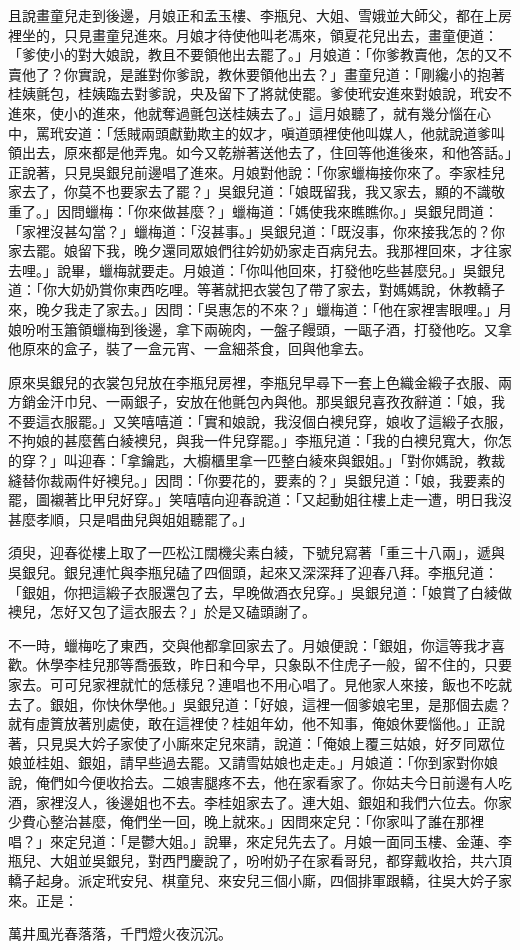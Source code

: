 且說畫童兒走到後邊，月娘正和孟玉樓、李瓶兒、大姐、雪娥並大師父，都在上房裡坐的，只見畫童兒進來。月娘才待使他叫老馮來，領夏花兒出去，畫童便道： 「爹使小的對大娘說，教且不要領他出去罷了。」月娘道：「你爹教賣他，怎的又不賣他了？你實說，是誰對你爹說，教休要領他出去？」畫童兒道：「剛纔小的抱著桂姨氈包，桂姨臨去對爹說，央及留下了將就使罷。爹使玳安進來對娘說，玳安不進來，使小的進來，他就奪過氈包送桂姨去了。」這月娘聽了，就有幾分惱在心中，罵玳安道：「恁賊兩頭獻勤欺主的奴才，嗔道頭裡使他叫媒人，他就說道爹叫領出去，原來都是他弄鬼。如今又乾辦著送他去了，住回等他進後來，和他答話。」正說著，只見吳銀兒前邊唱了進來。月娘對他說：「你家蠟梅接你來了。李家桂兒家去了，你莫不也要家去了罷？」吳銀兒道：「娘既留我，我又家去，顯的不識敬重了。」因問蠟梅：「你來做甚麼？」蠟梅道：「媽使我來瞧瞧你。」吳銀兒問道：「家裡沒甚勾當？」蠟梅道：「沒甚事。」吳銀兒道：「既沒事，你來接我怎的？你家去罷。娘留下我，晚夕還同眾娘們往妗奶奶家走百病兒去。我那裡回來，才往家去哩。」說畢，蠟梅就要走。月娘道：「你叫他回來，打發他吃些甚麼兒。」吳銀兒道：「你大奶奶賞你東西吃哩。等著就把衣裳包了帶了家去，對媽媽說，休教轎子來，晚夕我走了家去。」因問：「吳惠怎的不來？」蠟梅道：「他在家裡害眼哩。」月娘吩咐玉簫領蠟梅到後邊，拿下兩碗肉，一盤子饅頭，一甌子酒，打發他吃。又拿他原來的盒子，裝了一盒元宵、一盒細茶食，回與他拿去。

原來吳銀兒的衣裳包兒放在李瓶兒房裡，李瓶兒早尋下一套上色織金緞子衣服、兩方銷金汗巾兒、一兩銀子，安放在他氈包內與他。那吳銀兒喜孜孜辭道：「娘，我不要這衣服罷。」又笑嘻嘻道：「實和娘說，我沒個白襖兒穿，娘收了這緞子衣服，不拘娘的甚麼舊白綾襖兒，與我一件兒穿罷。」李瓶兒道：「我的白襖兒寬大，你怎的穿？」叫迎春：「拿鑰匙，大櫥櫃里拿一匹整白綾來與銀姐。」「對你媽說，教裁縫替你裁兩件好襖兒。」因問：「你要花的，要素的？」吳銀兒道：「娘，我要素的罷，圖襯著比甲兒好穿。」笑嘻嘻向迎春說道：「又起動姐往樓上走一遭，明日我沒甚麼孝順，只是唱曲兒與姐姐聽罷了。」

須臾，迎春從樓上取了一匹松江闊機尖素白綾，下號兒寫著「重三十八兩」，遞與吳銀兒。銀兒連忙與李瓶兒磕了四個頭，起來又深深拜了迎春八拜。李瓶兒道： 「銀姐，你把這緞子衣服還包了去，早晚做酒衣兒穿。」吳銀兒道：「娘賞了白綾做襖兒，怎好又包了這衣服去？」於是又磕頭謝了。

不一時，蠟梅吃了東西，交與他都拿回家去了。月娘便說：「銀姐，你這等我才喜歡。休學李桂兒那等喬張致，昨日和今早，只象臥不住虎子一般，留不住的，只要家去。可可兒家裡就忙的恁樣兒？連唱也不用心唱了。見他家人來接，飯也不吃就去了。銀姐，你快休學他。」吳銀兒道：「好娘，這裡一個爹娘宅里，是那個去處？就有虛篢放著別處使，敢在這裡使？桂姐年幼，他不知事，俺娘休要惱他。」正說著，只見吳大妗子家使了小廝來定兒來請，說道：「俺娘上覆三姑娘，好歹同眾位娘並桂姐、銀姐，請早些過去罷。又請雪姑娘也走走。」月娘道：「你到家對你娘說，俺們如今便收拾去。二娘害腿疼不去，他在家看家了。你姑夫今日前邊有人吃酒，家裡沒人，後邊姐也不去。李桂姐家去了。連大姐、銀姐和我們六位去。你家少費心整治甚麼，俺們坐一回，晚上就來。」因問來定兒：「你家叫了誰在那裡唱？」來定兒道：「是鬱大姐。」說畢，來定兒先去了。月娘一面同玉樓、金蓮、李瓶兒、大姐並吳銀兒，對西門慶說了，吩咐奶子在家看哥兒，都穿戴收拾，共六頂轎子起身。派定玳安兒、棋童兒、來安兒三個小廝，四個排軍跟轎，往吳大妗子家來。正是：

萬井風光春落落，千門燈火夜沉沉。

